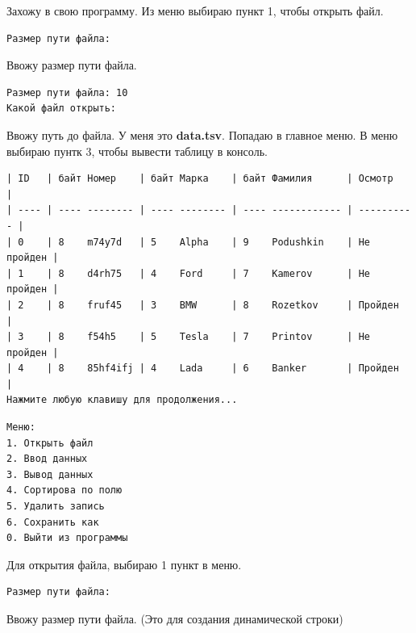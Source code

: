 Захожу в свою программу. Из меню выбираю пункт 1, чтобы открыть файл.

\begin{tcolorbox}
\begin{verbatim}
Размер пути файла: 
\end{verbatim}
\end{tcolorbox}

Ввожу размер пути файла.

\begin{tcolorbox}
\begin{verbatim}
Размер пути файла: 10
Какой файл открыть:     
\end{verbatim}
\end{tcolorbox}

Ввожу путь до файла. У меня это \textbf{data.tsv}. Попадаю в главное меню. В меню выбираю пунтк 3, чтобы вывести таблицу в консоль.

\begin{tcolorbox}
\begin{verbatim}
| ID   | байт Номер    | байт Марка    | байт Фамилия      | Осмотр     |
| ---- | ---- -------- | ---- -------- | ---- ------------ | ---------- |
| 0    | 8    m74y7d   | 5    Alpha    | 9    Podushkin    | Не пройден |
| 1    | 8    d4rh75   | 4    Ford     | 7    Kamerov      | Не пройден |
| 2    | 8    fruf45   | 3    BMW      | 8    Rozetkov     | Пройден    |
| 3    | 8    f54h5    | 5    Tesla    | 7    Printov      | Не пройден |
| 4    | 8    85hf4ifj | 4    Lada     | 6    Banker       | Пройден    |
Нажмите любую клавишу для продолжения...   
\end{verbatim}
\end{tcolorbox}

\begin{tcolorbox}
\begin{verbatim}
Меню:
1. Открыть файл      
2. Ввод данных       
3. Вывод данных      
4. Сортирова по полю 
5. Удалить запись    
6. Сохранить как     
0. Выйти из программы
\end{verbatim}
\end{tcolorbox}

Для открытия файла, выбираю 1 пункт в меню.

\begin{tcolorbox}
\begin{verbatim}
Размер пути файла: 
\end{verbatim}
\end{tcolorbox}

Ввожу размер пути файла. (Это для создания динамической строки)

